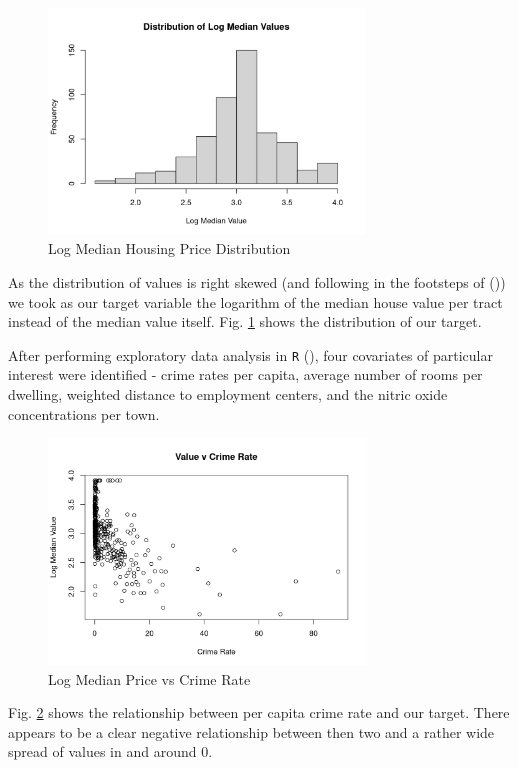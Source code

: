 \documentclass[11pt]{article}
\newcommand{\code}[1]{\colorbox{light-gray}{\texttt{#1}}}
\begin{document}
\begin{figure}[h!] 
  \centering
  \includegraphics[height=60mm]{price_dist.png}
  \caption{Log Median Housing Price Distribution}
  \label{fig:price_dist}
\end{figure}

\FloatBarrier


As the distribution of values is right skewed (and following in the footsteps of (\cite{book})) we took as our target variable the logarithm of the median house value per tract instead of the median value itself. Fig. \ref{fig:price_dist} shows the distribution of our target. 

After performing exploratory data analysis in \code{R} (\cite{R}), four covariates of particular interest were identified - crime rates per capita, average number of rooms per dwelling, weighted distance to employment centers, and the nitric oxide concentrations per town. 

\begin{figure}[h!] 
  \centering
  \includegraphics[height=60mm]{crime.png}
  \caption{Log Median Price vs Crime Rate}
  \label{fig:crime}
\end{figure}

\FloatBarrier

Fig. \ref{fig:crime} shows the relationship between per capita crime rate and our target. There appears to be a clear negative relationship between then two and a rather wide spread of values in and around 0. 
\end{document}
